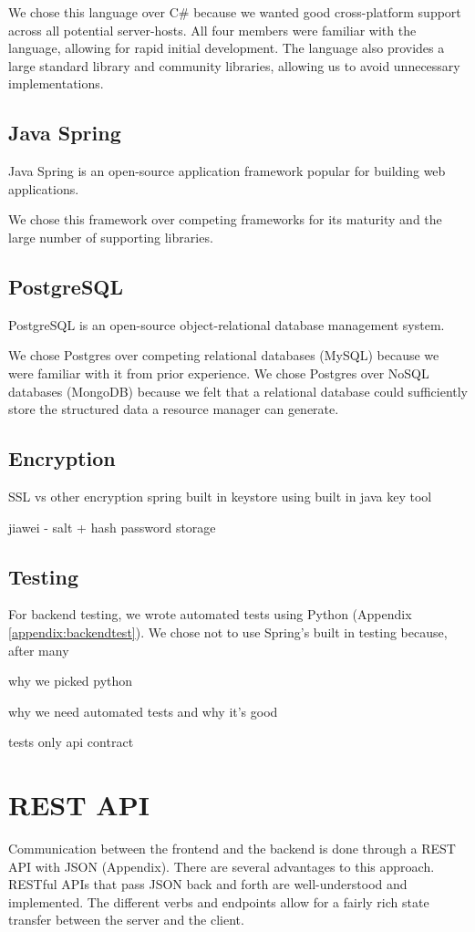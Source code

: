 \documentclass[12pt]{article}
\begin{document}
We chose this language over C\# because we wanted good cross-platform support across all potential server-hosts. All four members were familiar with the language, allowing for rapid initial development. The language also provides a large standard library and community libraries, allowing us to avoid unnecessary implementations. 

\subsection{Java Spring}
Java Spring is an open-source application framework popular for building web applications. 

We chose this framework over competing frameworks for its maturity and the large number of supporting libraries. 

\subsection{PostgreSQL}
PostgreSQL is an open-source object-relational database management system. 

We chose Postgres over competing relational databases (MySQL) because we were familiar with it from prior experience. We chose Postgres over NoSQL databases (MongoDB) because we felt that a relational database could sufficiently store the structured data a resource manager can generate. 

\subsection{Encryption}
SSL vs other encryption
spring built in 
keystore using built in java key tool 

jiawei - salt + hash password storage

\subsection{Testing}
For backend testing, we wrote automated tests using Python (Appendix \ref{appendix:backendtest}). We chose not to use Spring's built in testing because, after many
 
why we picked python

why we need automated tests and why it's good 

tests only api contract 

\section{REST API}
Communication between the frontend and the backend is done through a REST API with JSON (Appendix). There are several advantages to this approach. RESTful APIs that pass JSON back and forth are well-understood and implemented. The different verbs and endpoints allow for a fairly rich state transfer between the server and the client.
\end{document}

